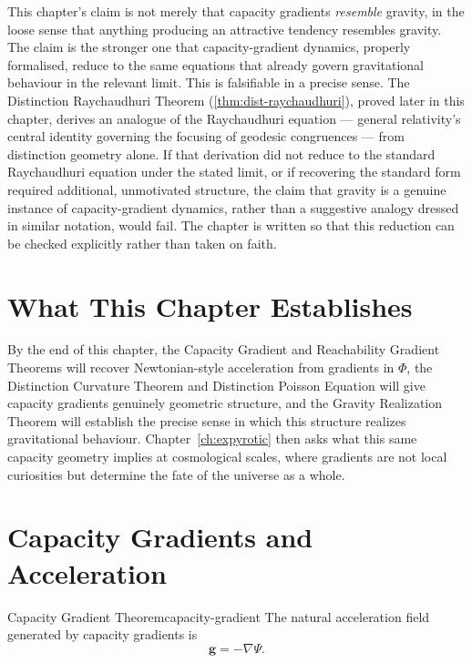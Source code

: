 \documentclass[12pt,twoside,openright]{book}
\begin{document}
This chapter's claim is not merely that capacity gradients
\emph{resemble} gravity, in the loose sense that anything
producing an attractive tendency resembles gravity. The claim
is the stronger one that capacity-gradient dynamics, properly
formalised, reduce to the same equations that already govern
gravitational behaviour in the relevant limit. This is
falsifiable in a precise sense. The Distinction Raychaudhuri
Theorem (\cref{thm:dist-raychaudhuri}), proved later in this
chapter, derives an analogue of the Raychaudhuri equation ---
general relativity's central identity governing the focusing
of geodesic congruences --- from distinction geometry alone.
If that derivation did not reduce to the standard Raychaudhuri
equation under the stated limit, or if recovering the standard
form required additional, unmotivated structure, the claim
that gravity is a genuine instance of capacity-gradient
dynamics, rather than a suggestive analogy dressed in similar
notation, would fail. The chapter is written so that this
reduction can be checked explicitly rather than taken on
faith.

\section{What This Chapter Establishes}
\label{sec:ch17-preview}

By the end of this chapter, the Capacity Gradient and
Reachability Gradient Theorems will recover Newtonian-style
acceleration from gradients in $\Phi$, the Distinction
Curvature Theorem and Distinction Poisson Equation will give
capacity gradients genuinely geometric structure, and the
Gravity Realization Theorem will establish the precise sense
in which this structure realizes gravitational behaviour.
Chapter~\ref{ch:expyrotic} then asks what this same capacity
geometry implies at cosmological scales, where gradients are
not local curiosities but determine the fate of the universe
as a whole.

\section{Capacity Gradients and Acceleration}
\label{sec:ch17-gradient}

\begin{theorem}{Capacity Gradient Theorem}{capacity-gradient}
  The natural acceleration field generated by capacity
  gradients is
  \[
    \mathbf{g} = -\nabla\Psi.
  \]
\end{theorem}
\end{document}
